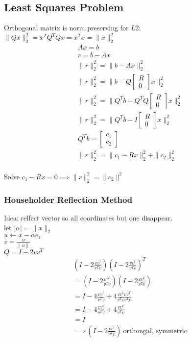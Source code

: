 \documentclass[8pt,letter]{article}
\begin{document}
\begin{multicols*}{2}
    \subsection{Least Squares Problem}
    Orthogonal matrix is norm preserving for $L2$:\\
    $\|Qx\|_2^2 = x^T Q^T Q x = x^T x = \|x\|_2^2$
    \begin{align*}
      & Ax=b\\
      & r = b-Ax\\
      & \|r\|_2^2 = \|b-Ax\|_2^2\\
      & \|r\|_2^2 = \|b-Q \begin{bmatrix} R \\ 0\end{bmatrix}x\|_2^2\\
      & \|r\|_2^2 = \|Q^Tb - Q^T Q \begin{bmatrix} R \\ 0\end{bmatrix}x\|_2^2\\
      & \|r\|_2^2 = \|Q^Tb - I\begin{bmatrix} R \\ 0\end{bmatrix}x\|_2^2\\
      & Q^T b = \begin{bmatrix} c_1 \\ c_2 \end{bmatrix}\\
      & \|r\|_2^2 = \|c_1 - Rx\|_2^2 + \|c_2\|_2^2\\
    \end{align*}

    Solve $c_1 - Rx=0 \implies \|r\|_2^2 = \|c_2\|^2$

    \vfill\null
    \columnbreak
        
    \subsubsection{Householder Reflection Method}
    Idea: relfect vector so all coordinates but one disappear.\\
    let $| \alpha | = \|x\|_2$\\
    $u \leftarrow x - \alpha e_1$\\
    $v = \frac{u}{\|u\|}$\\
    $Q = I - 2 vv^T$
    \begin{align*}
      & (I - 2 \frac{vv^t}{v^Tv}) (I - 2 \frac{vv^t}{v^Tv})^T\\
      & = (I - 2 \frac{vv^t}{v^Tv}) (I - 2 \frac{vv^t}{v^Tv})\\    
      & = I - 4 \frac{vv^t}{v^Tv} + 4 \frac{vv^t vv^T}{v^Tv v^Tv}\\
      & = I - 4 \frac{vv^t}{v^Tv} + 4 \frac{vv^t}{v^Tv}\\
      & = I\\
      & \implies (I - 2 \frac{vv^t}{v^Tv})\ \text{orthongal, symmetric}
    \end{align*}
    

\end{multicols*}
\end{document}
